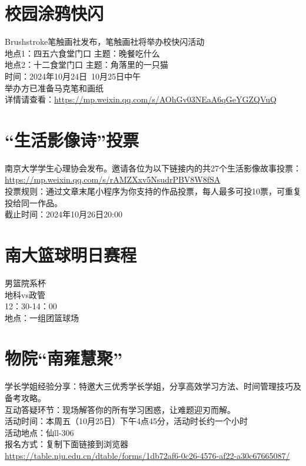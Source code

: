 \documentclass[letterpaper, 12pt]{article}
\begin{document}
\begin{multicols}{2}
\section{校园涂鸦快闪}
Brushstroke笔触画社发布，笔触画社将举办校快闪活动\\
地点1：四五六食堂门口    主题：晚餐吃什么\\
地点2：十二食堂门口      主题：角落里的一只猫\\
时间：2024年10月24日~10月25日中午\\
举办方已准备马克笔和画纸\\
详情请查看：\url{https://mp.weixin.qq.com/s/AOhGv03NEaA6qGeYGZQVuQ}\\




\section{“生活影像诗”投票}
南京大学学生心理协会发布。邀请各位为以下链接内的共27个生活影像故事投票：\\
\url{https://mp.weixin.qq.com/s/rAMZXxv5NsudrPBV8W8fSA}\\
投票规则：通过文章末尾小程序为你支持的作品投票，每人最多可投10票，可重复投给同一作品。\\
截止时间：2024年10月26日20:00\\
\section{南大篮球明日赛程}
男篮院系杯\\
地科vs政管\\
12：30-14：00\\
地点：一组团篮球场\\
\section{物院“南雍慧聚”}
学长学姐经验分享：特邀大三优秀学长学姐，分享高效学习方法、时间管理技巧及备考攻略。\\
互动答疑环节：现场解答你的所有学习困惑，让难题迎刃而解。\\
活动时间：本周五（10月25日）下午4点45分，活动时长约一个小时\\
活动地点：仙ll-306\\
报名方式：复制下面链接到浏览器\url{https://table.nju.edu.cn/dtable/forms/1db72af6-0c26-4576-af22-a30c67665087/}



\end{multicols}
\end{document}
